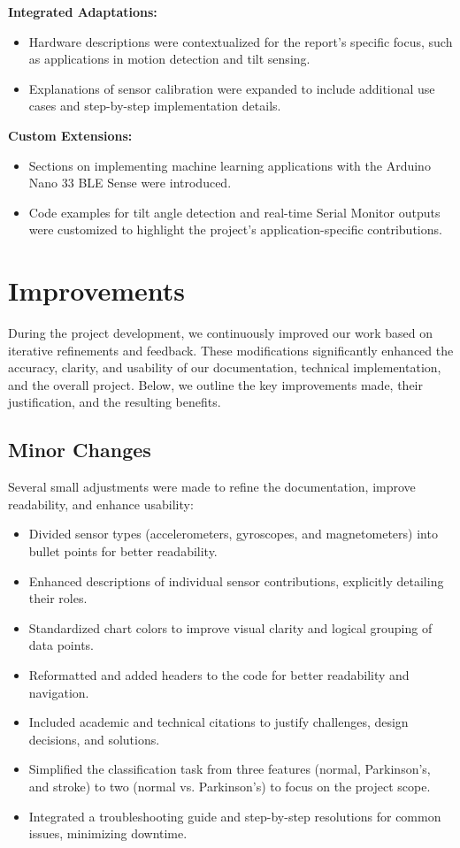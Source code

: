 \textbf{Integrated Adaptations:}
\begin{itemize}
	\item Hardware descriptions were contextualized for the report’s specific focus, such as applications in motion detection and tilt sensing.
	\item Explanations of sensor calibration were expanded to include additional use cases and step-by-step implementation details.
\end{itemize}

\textbf{Custom Extensions:}
\begin{itemize}
	\item Sections on implementing machine learning applications with the Arduino Nano 33 BLE Sense were introduced.
	\item Code examples for tilt angle detection and real-time Serial Monitor outputs were customized to highlight the project’s application-specific contributions.
\end{itemize}
\section{Improvements}

During the project development, we continuously improved our work based on iterative refinements and feedback. These modifications significantly enhanced the accuracy, clarity, and usability of our documentation, technical implementation, and the overall project. Below, we outline the key improvements made, their justification, and the resulting benefits.

\subsection{Minor Changes}
Several small adjustments were made to refine the documentation, improve readability, and enhance usability:
\begin{itemize}
	\item Divided sensor types (accelerometers, gyroscopes, and magnetometers) into bullet points for better readability.
	\item Enhanced descriptions of individual sensor contributions, explicitly detailing their roles.
	\item Standardized chart colors to improve visual clarity and logical grouping of data points.
	\item Reformatted and added headers to the code for better readability and navigation.
	\item Included academic and technical citations to justify challenges, design decisions, and solutions.
	\item Simplified the classification task from three features (normal, Parkinson’s, and stroke) to two (normal vs. Parkinson’s) to focus on the project scope.
	\item Integrated a troubleshooting guide and step-by-step resolutions for common issues, minimizing downtime.
\end{itemize}

